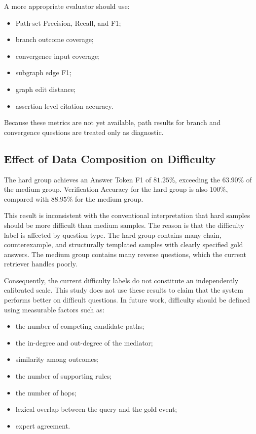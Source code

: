 A more appropriate evaluator should use:

\begin{itemize}
    \item Path-set Precision, Recall, and F1;
    \item branch outcome coverage;
    \item convergence input coverage;
    \item subgraph edge F1;
    \item graph edit distance;
    \item assertion-level citation accuracy.
\end{itemize}

Because these metrics are not yet available, path results for branch and
convergence questions are treated only as diagnostic.

\subsection{Effect of Data Composition on Difficulty}

The hard group achieves an Answer Token F1 of \(81.25\%\), exceeding the
\(63.90\%\) of the medium group. Verification Accuracy for the hard group is
also \(100\%\), compared with \(88.95\%\) for the medium group.

This result is inconsistent with the conventional interpretation that hard
samples should be more difficult than medium samples. The reason is that the
difficulty label is affected by question type. The hard group contains many
chain, counterexample, and structurally templated samples with clearly
specified gold answers. The medium group contains many reverse questions,
which the current retriever handles poorly.

Consequently, the current difficulty labels do not constitute an
independently calibrated scale. This study does not use these results to
claim that the system performs better on difficult questions. In future
work, difficulty should be defined using measurable factors such as:

\begin{itemize}
    \item the number of competing candidate paths;
    \item the in-degree and out-degree of the mediator;
    \item similarity among outcomes;
    \item the number of supporting rules;
    \item the number of hops;
    \item lexical overlap between the query and the gold event;
    \item expert agreement.
\end{itemize}

